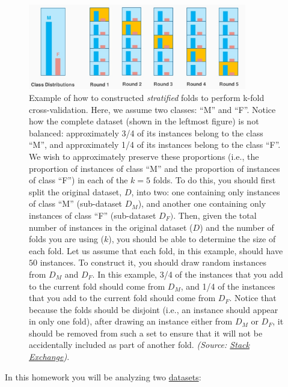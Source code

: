 \documentclass[letterpaper]{article}
\begin{document}
    \begin{figure}[hb!!]
        \centering
        \includegraphics[width=0.85\textwidth]{figures/cross_val_stratified2.png}
        \caption{Example of how to constructed \textit{stratified} folds to perform k-fold cross-validation. Here, we assume two classes: ``M'' and ``F''. Notice how the complete dataset (shown in the leftmost figure) is not balanced: approximately 3/4 of its instances belong to the class ``M'', and approximately 1/4 of its instances belong to the class ``F''. We wish to approximately preserve these proportions (i.e., the proportion of instances of class ``M'' and the proportion of instances of class ``F'') in each of the $k=5$ folds. To do this, you should first split the original dataset, $D$, into two: one containing only instances of class ``M'' (sub-dataset $D_M$), and another one containing only instances of class  ``F'' (sub-dataset $D_F)$. Then, given the total number of instances in the original dataset ($D$) and the number of folds you are using ($k$), you should be able to determine the size of each fold. Let us assume that each fold, in this example, should have $50$ instances. To construct it, you should draw random instances from $D_M$ and $D_F$. In this example, 3/4 of the instances that you add to the current fold should come from $D_M$, and 1/4 of the instances that you add to the current fold should come from $D_F$. Notice that because the folds should be disjoint (i.e., an instance should appear in only one fold), after drawing an instance either from $D_M$ or $D_F$, it should be removed from such a set to ensure that it will not be accidentally included as part of another fold. \textit{(Source: \href{https://stats.stackexchange.com/questions/49540/understanding-stratified-cross-validation}{Stack Exchange})}.}
        \label{fig:cross-val}
    \end{figure}

\clearpage
In this homework you will be analyzing two \href{https://people.cs.umass.edu/~bsilva/courses/CMPSCI_589/Spring2023/homeworks/hw3.zip}{datasets}:
\end{document}
